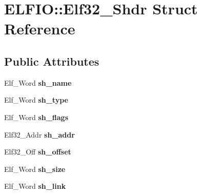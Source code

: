 \hypertarget{struct_e_l_f_i_o_1_1_elf32___shdr}{}\section{E\+L\+F\+IO\+:\+:Elf32\+\_\+\+Shdr Struct Reference}
\label{struct_e_l_f_i_o_1_1_elf32___shdr}
\subsection*{Public Attributes}
\begin{DoxyCompactItemize}
\item 
Elf\+\_\+\+Word {\bfseries sh\+\_\+name}\hypertarget{struct_e_l_f_i_o_1_1_elf32___shdr_a1a86cd01115334d2f8f88a81ac506005}{}\label{struct_e_l_f_i_o_1_1_elf32___shdr_a1a86cd01115334d2f8f88a81ac506005}

\item 
Elf\+\_\+\+Word {\bfseries sh\+\_\+type}\hypertarget{struct_e_l_f_i_o_1_1_elf32___shdr_a3d32c52d832aa450f24419fd3c05fc89}{}\label{struct_e_l_f_i_o_1_1_elf32___shdr_a3d32c52d832aa450f24419fd3c05fc89}

\item 
Elf\+\_\+\+Word {\bfseries sh\+\_\+flags}\hypertarget{struct_e_l_f_i_o_1_1_elf32___shdr_a77c5de7edab6cd8d645b61bb04ec0303}{}\label{struct_e_l_f_i_o_1_1_elf32___shdr_a77c5de7edab6cd8d645b61bb04ec0303}

\item 
Elf32\+\_\+\+Addr {\bfseries sh\+\_\+addr}\hypertarget{struct_e_l_f_i_o_1_1_elf32___shdr_a5e357acebe6312d21e718db5894b1802}{}\label{struct_e_l_f_i_o_1_1_elf32___shdr_a5e357acebe6312d21e718db5894b1802}

\item 
Elf32\+\_\+\+Off {\bfseries sh\+\_\+offset}\hypertarget{struct_e_l_f_i_o_1_1_elf32___shdr_acd5a4f8850495ddc15cf05c5d7d6b481}{}\label{struct_e_l_f_i_o_1_1_elf32___shdr_acd5a4f8850495ddc15cf05c5d7d6b481}

\item 
Elf\+\_\+\+Word {\bfseries sh\+\_\+size}\hypertarget{struct_e_l_f_i_o_1_1_elf32___shdr_aa9ff5559f9070d5d0bda3c8d83b54630}{}\label{struct_e_l_f_i_o_1_1_elf32___shdr_aa9ff5559f9070d5d0bda3c8d83b54630}

\item 
Elf\+\_\+\+Word {\bfseries sh\+\_\+link}\hypertarget{struct_e_l_f_i_o_1_1_elf32___shdr_a1ee4a373f6d9033a9f43d4d359b3661b}{}\label{struct_e_l_f_i_o_1_1_elf32___shdr_a1ee4a373f6d9033a9f43d4d359b3661b}


\end{DoxyCompactItemize}
